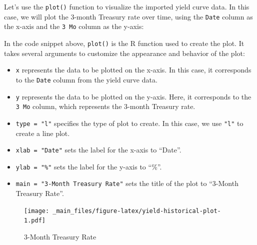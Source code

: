\documentclass[
]{book}
\newenvironment{Shaded}{\begin{snugshade}}{\end{snugshade}}
\newcommand{\AttributeTok}[1]{\textcolor[rgb]{0.13,0.29,0.53}{#1}}
\newcommand{\CommentTok}[1]{\textcolor[rgb]{0.56,0.35,0.01}{\textit{#1}}}
\newcommand{\FunctionTok}[1]{\textcolor[rgb]{0.13,0.29,0.53}{\textbf{#1}}}
\newcommand{\NormalTok}[1]{#1}
\newcommand{\SpecialCharTok}[1]{\textcolor[rgb]{0.81,0.36,0.00}{\textbf{#1}}}
\newcommand{\StringTok}[1]{\textcolor[rgb]{0.31,0.60,0.02}{#1}}
\providecommand{\tightlist}{%
  \setlength{\itemsep}{0pt}\setlength{\parskip}{0pt}}
\begin{document}
Let's use the \texttt{plot()} function to visualize the imported yield curve data. In this case, we will plot the 3-month Treasury rate over time, using the \texttt{Date} column as the x-axis and the \texttt{3\ Mo} column as the y-axis:

\begin{Shaded}
\end{Shaded}

In the code snippet above, \texttt{plot()} is the R function used to create the plot. It takes several arguments to customize the appearance and behavior of the plot:

\begin{itemize}
\tightlist
\item
  \texttt{x} represents the data to be plotted on the x-axis. In this case, it corresponds to the \texttt{Date} column from the yield curve data.
\item
  \texttt{y} represents the data to be plotted on the y-axis. Here, it corresponds to the \texttt{3\ Mo} column, which represents the 3-month Treasury rate.
\item
  \texttt{type\ =\ "l"} specifies the type of plot to create. In this case, we use \texttt{"l"} to create a line plot.
\item
  \texttt{xlab\ =\ "Date"} sets the label for the x-axis to ``Date''.
\item
  \texttt{ylab\ =\ "\%"} sets the label for the y-axis to ``\%''.
\item
  \texttt{main\ =\ "3-Month\ Treasury\ Rate"} sets the title of the plot to ``3-Month Treasury Rate''.
\end{itemize}

\begin{figure}
\centering
\texttt{[image: \_main\_files/figure-latex/yield-historical-plot-1.pdf]}
\caption{\label{fig:yield-historical-plot}3-Month Treasury Rate}
\end{figure}
\end{document}

